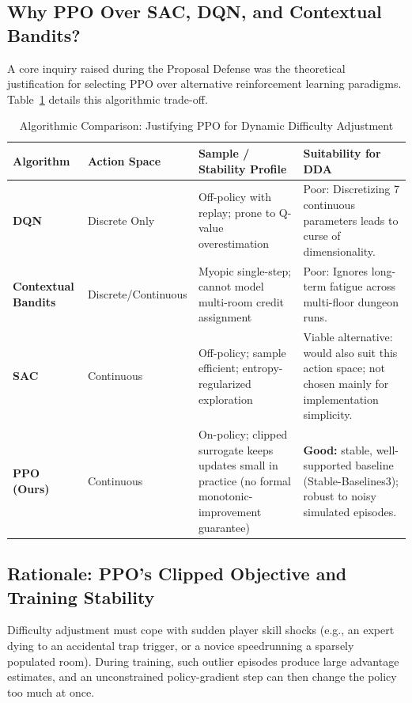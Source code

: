 \subsection{Why PPO Over SAC, DQN, and Contextual Bandits?}
A core inquiry raised during the Proposal Defense was the theoretical justification for selecting PPO over alternative reinforcement learning paradigms. Table~\ref{tab:rl_comparison} details this algorithmic trade-off.

\begin{table}[!htbp]
\centering
\caption{Algorithmic Comparison: Justifying PPO for Dynamic Difficulty Adjustment}
\label{tab:rl_comparison}
\small
\begin{tabular}{p{}p{}p{}p{}}
\toprule
\textbf{Algorithm} & \textbf{Action Space} & \textbf{Sample / Stability Profile} & \textbf{Suitability for DDA} \\
\midrule
\textbf{DQN}~\cite{mnih2015human} & Discrete Only & Off-policy with replay; prone to Q-value overestimation & Poor: Discretizing 7 continuous parameters leads to curse of dimensionality. \\
\textbf{Contextual Bandits} & Discrete/Continuous & Myopic single-step; cannot model multi-room credit assignment & Poor: Ignores long-term fatigue across multi-floor dungeon runs. \\
\textbf{SAC}~\cite{haarnoja2018soft} & Continuous & Off-policy; sample efficient; entropy-regularized exploration & Viable alternative: would also suit this action space; not chosen mainly for implementation simplicity. \\
\textbf{PPO (Ours)}~\cite{schulman2017proximal} & Continuous & On-policy; clipped surrogate keeps updates small in practice (no formal monotonic-improvement guarantee) & \textbf{Good:} stable, well-supported baseline (Stable-Baselines3); robust to noisy simulated episodes. \\
\bottomrule
\end{tabular}
\end{table}

\subsection{Rationale: PPO's Clipped Objective and Training Stability}\label{sec:ppo_proof}
Difficulty adjustment must cope with sudden player skill shocks (e.g., an expert dying to an accidental trap trigger, or a novice speedrunning a sparsely populated room). During training, such outlier episodes produce large advantage estimates, and an unconstrained policy-gradient step can then change the policy too much at once.


